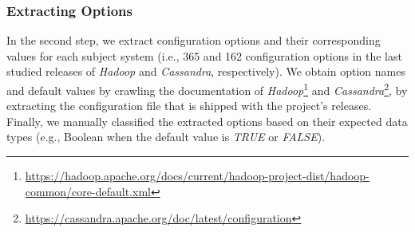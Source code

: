 
\subsubsection{Extracting Options}

In the second step, we extract configuration options and their corresponding values for each subject system (i.e., 365 and 162 configuration options in the last studied releases of \emph{Hadoop} and \emph{Cassandra}, respectively). %
We obtain option names and default values by crawling the documentation of \emph{Hadoop}\footnote{\url{https://hadoop.apache.org/docs/current/hadoop-project-dist/hadoop-common/core-default.xml}} and \emph{Cassandra}\footnote{\url{https://cassandra.apache.org/doc/latest/configuration}}, by extracting the configuration file that is shipped with the project's releases. Finally, we manually classified the extracted options based on their expected data types (e.g., Boolean when the default value is \emph{TRUE} or \emph{FALSE}).


